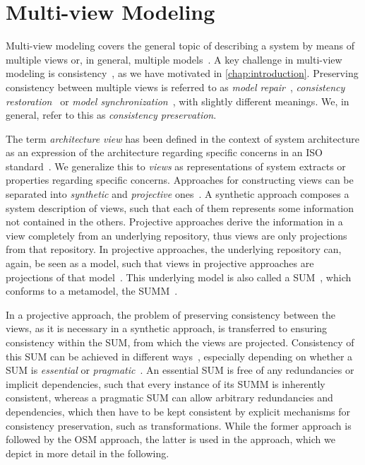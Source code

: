\section{Multi-view Modeling}
\label{chap:foundations:multiview}

Multi-view modeling covers the general topic of describing a system by means of multiple views or, in general, multiple models~\cite{reineke2019ProblemMultiView-SoSym}.
A key challenge in multi-view modeling is consistency~\cite{reineke2019ProblemMultiView-SoSym}, as we have motivated in \autoref{chap:introduction}.
Preserving consistency between multiple views is referred to as \emph{model repair}~\cite{macedo2017ModelRepairClassification-TSE}, \emph{consistency restoration}~\cite{stevens2010sosym, kramer2017a} or \emph{model synchronization}~\cite{diskin2016Taxonomy-JSS}, with slightly different meanings.
We, in general, refer to this as \emph{consistency preservation}.

The term \emph{architecture view} has been defined in the context of system architecture as an expression of the architecture regarding specific concerns in an ISO standard~\cite[p.~2]{iso42010}.
We generalize this to \emph{views} as representations of system extracts or properties regarding specific concerns.
Approaches for constructing views can be separated into \emph{synthetic} and \emph{projective} ones~\cite[p.~22]{iso42010}.
A synthetic approach composes a system description of views, such that each of them represents some information not contained in the others.
Projective approaches derive the information in a view completely from an underlying repository, thus views are only projections from that repository.
In projective approaches, the underlying repository can, again, be seen as a model, such that views in projective approaches are projections of that model~.
This underlying model is also called a \gls{SUM}~\cite[p.~210]{atkinson2010a}, which conforms to a metamodel, the \gls{SUMM}~.

In a projective approach, the problem of preserving consistency between the views, as it is necessary in a synthetic approach, is transferred to ensuring consistency within the \gls{SUM}, from which the views are projected.
Consistency of this \gls{SUM} can be achieved in different ways~, especially depending on whether a \gls{SUM} is \emph{essential} or \emph{pragmatic}~\cite{atkinson2015realizationMultiView-EDOC}.
An essential \gls{SUM} is free of any redundancies or implicit dependencies, such that every instance of its \gls{SUMM} is inherently consistent, whereas a pragmatic \gls{SUM} can allow arbitrary redundancies and dependencies, which then have to be kept consistent by explicit mechanisms for consistency preservation, such as transformations.
While the former approach is followed by the \acrlong{OSM} approach, the latter is used in the \vitruv approach, which we depict in more detail in the following.

